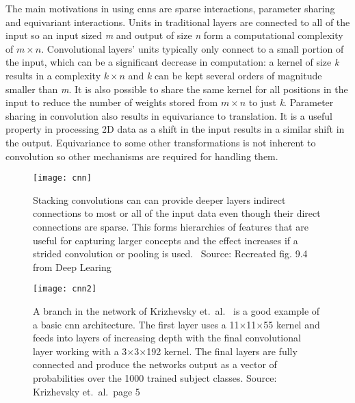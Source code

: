 The main motivations in using \ac{cnn}s are sparse interactions, parameter sharing
and equivariant interactions. Units in traditional layers are connected to all of the
input so an input sized \textit{m} and output of size \textit{n} form a computational
complexity of $m \times n$. Convolutional layers' units typically only connect to a small
portion of the input, which can be a significant decrease in computation: a kernel of
size \textit{k} results in a complexity $k \times n$ and \textit{k} can be kept several
orders of magnitude smaller than \textit{m}. It is also possible to share the same kernel
for all positions in the input to reduce the number of weights stored from $m \times n$
to just \textit{k}. Parameter sharing in convolution also results in equivariance to
translation. It is a useful property in processing 2D data as a shift in the input
results in a similar shift in the output. Equivariance to some other transformations is not
inherent to convolution so other mechanisms are required for handling them.

\begin{figure}[H]
\centering
\texttt{[image: cnn]}
\caption{Stacking convolutions can can provide deeper layers indirect connections to
         most or all of the input data even though their direct connections are sparse.
         This forms hierarchies of features that are useful for capturing larger concepts
         and the effect increases if a strided convolution or pooling is used.~\cite{DEEP_LEARNING}
         Source: Recreated fig. 9.4 from Deep Learing~\cite{DEEP_LEARNING}}\label{fig:scon}
\end{figure}

\begin{figure}[H]
\centering
\texttt{[image: cnn2]}
\caption{A branch in the network of Krizhevsky et.~al.~\cite{NIPS_IMAGENET} is a good example
         of a basic \ac{cnn} architecture. The first layer uses a 11$\times$11$\times$55
         kernel and feeds into layers of increasing depth with the final convolutional layer
         working with a 3$\times$3$\times$192 kernel. The final layers are fully connected
         and produce the networks output as a vector of probabilities over the 1000 trained
         subject classes. Source: Krizhevsky et.~al.~page 5~\cite{NIPS_IMAGENET}}\label{fig:cnn}
\end{figure}

